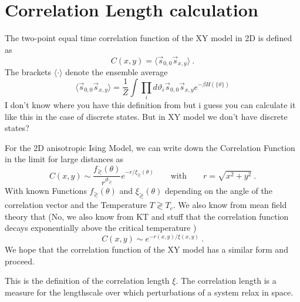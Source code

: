 	\section{Correlation Length calculation} \label{Section::Corr-Lenght-Calculation}
	The two-point equal time correlation function of the XY model in 2D is defined as
	\begin{equation}
		C(x, y) = \langle \vec{s}_{0,0} \vec{s}_{x, y} \rangle ~.
	\end{equation}
	The brackets $\langle \cdot \rangle$ denote the ensemble average
	\begin{equation}
		\langle \vec{s}_{0,0} \vec{s}_{x, y} \rangle  = \frac{1}{Z} \int \prod_i d\vartheta_i \vec{s}_{0,0} \vec{s}_{x, y} e^{- \beta H(\{\vartheta\})}
	\end{equation}
	I don't know where you have this definition from but i guess you can calculate it like this in the case of discrete states. But in XY model we don't have discrete states?
	
	
	For the 2D anisotropic Ising Model, we can write down the Correlation Function in the limit for large distances as
	\begin{equation}
		C(x, y) \sim \frac{f_\gtrless(\theta)}{r^{\vartheta_\gtrless}} 	e^{-r /	\xi_\gtrless(\theta)} \qquad \text{with} \qquad r =	\sqrt{x^2 + y^2} ~.
	\end{equation}
	With known Functions $f_\gtrless(\theta)$ and $\xi_\gtrless(\theta)$ depending on the angle of the correlation vector and the Temperature $ T \gtrless T_c$. We also know from mean field theory that (No, we also know from KT and stuff that the correlation function decays exponentially above the critical temperature \cite{kosterlitz1974critical, amit1980renormalisation})
	\begin{equation}
		C(x, y) \sim e^{-r(x,y) /	\xi(x,y)}~.
	\end{equation}
	We hope that the correlation function of the XY model has a similar form and proceed.
	
	This is the definition of the correlation length $\xi$. The correlation length is a measure for the lengthscale over which perturbations of a system relax in space.
	
